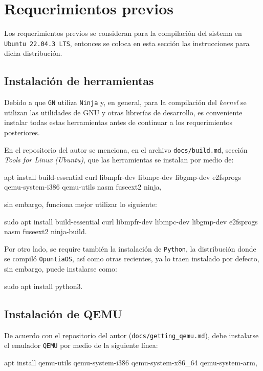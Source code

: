 \section{Requerimientos previos \label{sec:reqPrevios}}
Los requerimientos previos se consideran para la compilación del sistema en
\texttt{Ubuntu 22.04.3 LTS}, entonces se coloca en esta sección las instrucciones 
para dicha distribución.

\subsection{Instalación de herramientas}
	Debido a que \texttt{GN} utiliza \texttt{Ninja} y, en general, para la 
	compilación del \textit{kernel} se utilizan las utilidades de GNU y otras
	librerías de desarrollo, es conveniente instalar todas estas herramientas antes de continuar a los requerimientos posteriores.
	
	
	
	En el repositorio del autor se menciona, en el archivo \texttt{docs/build.md}, sección \textit{Tools for Linux (Ubuntu)}, que las
	herramientas se instalan por medio de:
	\begin{center}
		\ttfamily
		apt install build-essential curl libmpfr-dev libmpc-dev libgmp-dev e2fsprogs qemu-system-i386 qemu-utils nasm fuseext2 ninja,
	\end{center}

	
	
	sin embargo, funciona mejor utilizar lo siguiente:
	\begin{center}
		\ttfamily
		sudo apt install build-essential curl libmpfr-dev libmpc-dev libgmp-dev e2fsprogs nasm fuseext2 ninja-build.
	\end{center}

	
	
	Por otro lado, se require también la instalación de \texttt{Python}, la distribución donde se compiló \texttt{OpuntiaOS}, así como otras recientes, ya lo
	traen instalado por defecto, sin embargo, puede instalarse como:
	\begin{center}
		\ttfamily
		sudo apt install python3.
	\end{center}


\subsection{Instalación de QEMU \label{ssec:installQuemu}}
	De acuerdo con el repositorio del autor (\texttt{docs/getting\_qemu.md}), debe 
	instalarse el emulador \texttt{QEMU} por medio de la siguiente línea:
	\begin{center}
		\ttfamily
		apt install qemu-utils qemu-system-i386 qemu-system-x86\_64 qemu-system-arm,
	\end{center}

